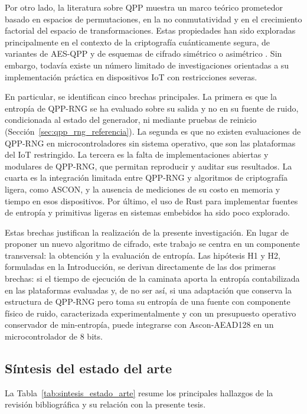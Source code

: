 Por otro lado, la literatura sobre QPP muestra un marco teórico prometedor basado en espacios de permutaciones, en la no conmutatividad y en el crecimiento factorial del espacio de transformaciones. Estas propiedades han sido exploradas principalmente en el contexto de la criptografía cuánticamente segura, de variantes de AES-QPP y de esquemas de cifrado simétrico o asimétrico \cite{Kuang2022QuantumCryptography,Kuang2024QPPGroup,Kuang2022QuantumSystems}. Sin embargo, todavía existe un número limitado de investigaciones orientadas a su implementación práctica en dispositivos IoT con restricciones severas.

En particular, se identifican cinco brechas principales. La primera es que la entropía de QPP-RNG se ha evaluado sobre su salida y no en su fuente de ruido, condicionada al estado del generador, ni mediante pruebas de reinicio (Sección~\ref{sec:qpp_rng_referencia}). La segunda es que no existen evaluaciones de QPP-RNG en microcontroladores sin sistema operativo, que son las plataformas del IoT restringido. La tercera es la falta de implementaciones abiertas y modulares de QPP-RNG, que permitan reproducir y auditar sus resultados. La cuarta es la integración limitada entre QPP-RNG y algoritmos de criptografía ligera, como ASCON, y la ausencia de mediciones de su costo en memoria y tiempo en esos dispositivos. Por último, el uso de Rust para implementar fuentes de entropía y primitivas ligeras en sistemas embebidos ha sido poco explorado.

Estas brechas justifican la realización de la presente investigación. En lugar de proponer un nuevo algoritmo de cifrado, este trabajo se centra en un componente transversal: la obtención y la evaluación de entropía. Las hipótesis H1 y H2, formuladas en la Introducción, se derivan directamente de las dos primeras brechas: si el tiempo de ejecución de la caminata aporta la entropía contabilizada en las plataformas evaluadas y, de no ser así, si una adaptación que conserva la estructura de QPP-RNG pero toma su entropía de una fuente con componente físico de ruido, caracterizada experimentalmente y con un presupuesto operativo conservador de min-entropía, puede integrarse con Ascon-AEAD128 en un microcontrolador de 8 bits.

\subsection{Síntesis del estado del arte}

La Tabla~\ref{tab:sintesis_estado_arte} resume los principales hallazgos de la revisión bibliográfica y su relación con la presente tesis.

